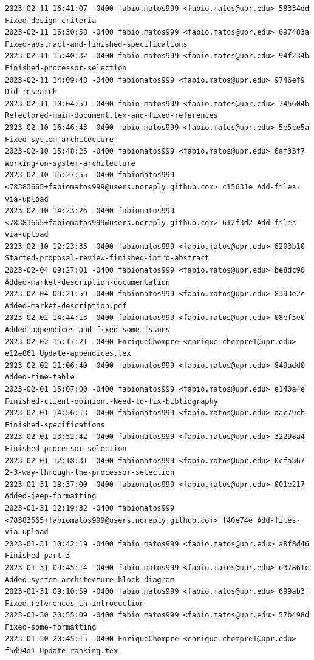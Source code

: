 \documentclass[12pt]{article}
\begin{document}
\begin{lstlisting}
2023-02-11 16:41:07 -0400 fabio.matos999 <fabio.matos@upr.edu> 58334dd Fixed-design-criteria
2023-02-11 16:30:58 -0400 fabio.matos999 <fabio.matos@upr.edu> 697483a Fixed-abstract-and-finished-specifications
2023-02-11 15:40:32 -0400 fabio.matos999 <fabio.matos@upr.edu> 94f234b Finished-processor-selection
2023-02-11 14:09:48 -0400 fabiomatos999 <fabio.matos@upr.edu> 9746ef9 Did-research
2023-02-11 10:04:59 -0400 fabio.matos999 <fabio.matos@upr.edu> 745604b Refectored-main-document.tex-and-fixed-references
2023-02-10 16:46:43 -0400 fabio.matos999 <fabio.matos@upr.edu> 5e5ce5a Fixed-system-architecture
2023-02-10 15:48:25 -0400 fabiomatos999 <fabio.matos@upr.edu> 6af33f7 Working-on-system-architecture
2023-02-10 15:27:55 -0400 fabiomatos999 <78383665+fabiomatos999@users.noreply.github.com> c15631e Add-files-via-upload
2023-02-10 14:23:26 -0400 fabiomatos999 <78383665+fabiomatos999@users.noreply.github.com> 612f3d2 Add-files-via-upload
2023-02-10 12:23:35 -0400 fabiomatos999 <fabio.matos@upr.edu> 6203b10 Started-proposal-review-finished-intro-abstract
2023-02-04 09:27:01 -0400 fabiomatos999 <fabio.matos@upr.edu> be8dc90 Added-market-description-documentation
2023-02-04 09:21:59 -0400 fabiomatos999 <fabio.matos@upr.edu> 8393e2c Added-market-description.pdf
2023-02-02 14:44:13 -0400 fabiomatos999 <fabio.matos@upr.edu> 08ef5e0 Added-appendices-and-fixed-some-issues
2023-02-02 15:17:21 -0400 EnriqueChompre <enrique.chompre1@upr.edu> e12e861 Update-appendices.tex
2023-02-02 11:06:40 -0400 fabiomatos999 <fabio.matos@upr.edu> 849add0 Added-time-table
2023-02-01 15:07:00 -0400 fabiomatos999 <fabio.matos@upr.edu> e140a4e Finished-client-opinion.-Need-to-fix-bibliography
2023-02-01 14:56:13 -0400 fabiomatos999 <fabio.matos@upr.edu> aac79cb Finished-specifications
2023-02-01 13:52:42 -0400 fabiomatos999 <fabio.matos@upr.edu> 32298a4 Finished-processor-selection
2023-02-01 12:18:31 -0400 fabiomatos999 <fabio.matos@upr.edu> 0cfa567 2-3-way-through-the-processor-selection
2023-01-31 18:37:00 -0400 fabiomatos999 <fabio.matos@upr.edu> 001e217 Added-jeep-formatting
2023-01-31 12:19:32 -0400 fabiomatos999 <78383665+fabiomatos999@users.noreply.github.com> f40e74e Add-files-via-upload
2023-01-31 10:42:19 -0400 fabio.matos999 <fabio.matos@upr.edu> a8f8d46 Finished-part-3
2023-01-31 09:45:14 -0400 fabio.matos999 <fabio.matos@upr.edu> e37861c Added-system-architecture-block-diagram
2023-01-31 09:10:59 -0400 fabio.matos999 <fabio.matos@upr.edu> 699ab3f Fixed-references-in-introduction
2023-01-30 20:55:09 -0400 fabio.matos999 <fabio.matos@upr.edu> 57b498d Fixed-some-formatting
2023-01-30 20:45:15 -0400 EnriqueChompre <enrique.chompre1@upr.edu> f5d94d1 Update-ranking.tex

\end{lstlisting}
\end{document}
